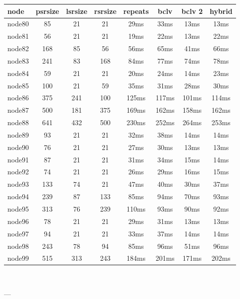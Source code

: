 \begin{tabular}{|l|c|c|c|c|c|c|c|}
\hline node & psrsize & lsrsize & rsrsize   & repeats & bclv & bclv 2 & hybrid\\
    \hline node80 & 85 & 21 & 21 & 29ms & 33ms & 13ms & 13ms\\
    \hline node81 & 56 & 21 & 21 & 19ms & 22ms & 13ms & 22ms\\
    \hline node82 & 168 & 85 & 56 & 56ms & 65ms & 41ms & 66ms\\
    \hline node83 & 241 & 83 & 168 & 84ms & 77ms & 74ms & 78ms\\
    \hline node84 & 59 & 21 & 21 & 20ms & 24ms & 14ms & 23ms\\
    \hline node85 & 100 & 21 & 59 & 35ms & 31ms & 28ms & 30ms\\
    \hline node86 & 375 & 241 & 100 & 125ms & 117ms & 101ms & 114ms\\
    \hline node87 & 500 & 181 & 375 & 169ms & 162ms & 158ms & 162ms\\
    \hline node88 & 641 & 432 & 500 & 230ms & 252ms & 264ms & 253ms\\
    \hline node89 & 93 & 21 & 21 & 32ms & 38ms & 14ms & 14ms\\
    \hline node90 & 76 & 21 & 21 & 27ms & 30ms & 13ms & 13ms\\
    \hline node91 & 87 & 21 & 21 & 31ms & 34ms & 15ms & 14ms\\
    \hline node92 & 74 & 21 & 21 & 26ms & 29ms & 16ms & 15ms\\
    \hline node93 & 133 & 74 & 21 & 47ms & 40ms & 30ms & 37ms\\
    \hline node94 & 239 & 87 & 133 & 85ms & 94ms & 70ms & 93ms\\
    \hline node95 & 313 & 76 & 239 & 110ms & 93ms & 90ms & 92ms\\
    \hline node96 & 78 & 21 & 21 & 29ms & 31ms & 13ms & 13ms\\
    \hline node97 & 94 & 21 & 21 & 33ms & 37ms & 14ms & 14ms\\
    \hline node98 & 243 & 78 & 94 & 85ms & 96ms & 51ms & 96ms\\
    \hline node99 & 515 & 313 & 243 & 184ms & 201ms & 171ms & 202ms\\

\hline
\end{tabular} \

---



